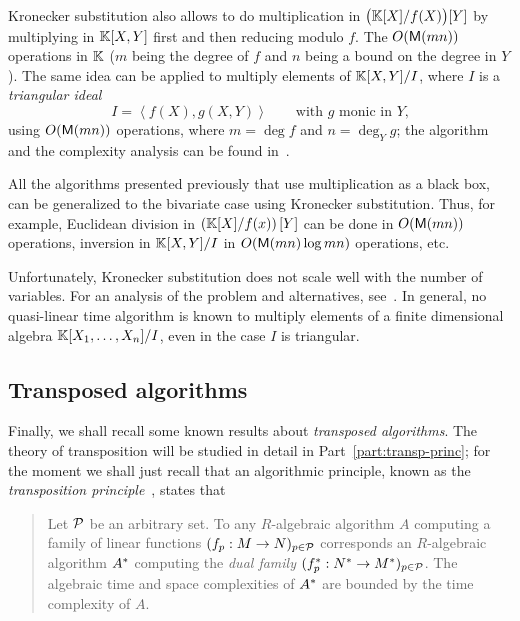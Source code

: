 Kronecker substitution also allows to do multiplication in
$\bigl(\mathbb{K}[X]/f(X)\bigr)[Y]$ by multiplying in $\mathbb{K}[X,Y]$ first and then
reducing modulo $f$. The $O(\mathsf{M}(mn))$ operations in $\mathbb{K}$ ($m$ being
the degree of $f$ and $n$ being a bound on the degree in $Y$). The
same idea can be applied to multiply elements of $\mathbb{K}[X,Y]/I$, where $I$
is a \emph{triangular ideal}
\begin{equation}
  \label{eq:228}
  I = \left\langle f(X), g(X,Y)\right\rangle
  \qquad\text{with $g$ monic in $Y$,}
\end{equation}
using $O(\mathsf{M}(mn))$ operations, where $m=\deg f$ and $n=\deg_Y g$;
the algorithm and the complexity analysis can be found
in~\cite[Proposition~4]{pascal+schost06}.

All the algorithms presented previously that use multiplication as a
black box, can be generalized to the bivariate case using Kronecker
substitution. Thus, for example, Euclidean division in
$\left(\mathbb{K}[X]/f(x)\right)[Y]$ can be done in $O(\mathsf{M}(mn))$ operations,
inversion in $\mathbb{K}[X,Y]/I$ in $O(\mathsf{M}(mn)\log mn)$ operations, etc.

  Unfortunately,
Kronecker substitution does not scale well with the number of
variables. For an analysis of the problem and alternatives,
see~\cite{schost05,li+moreno+schost07}. In general, no quasi-linear
time algorithm is known to multiply elements of a finite dimensional
algebra $\mathbb{K}[X_1,\ldots,X_n]/I$, even in the case $I$ is triangular.


\subsection{Transposed algorithms}
\label{sec:transp-algor}
Finally, we shall recall some known results about
\emph{transposed algorithms}. The theory
of transposition will be studied in detail in
Part~\ref{part:transp-princ}; for the moment we shall just recall that
an algorithmic principle, known as the
\emph{transposition
  principle}~\cite{shoup94,shoup95,shoup99,Ka2K,hanrot+quercia+zimmermann,bostan+lecerf+schost:tellegen},
states that
\begin{quote}
  Let $\mathcal{P}$ be an arbitrary set. To any $R$-algebraic algorithm
  $A$ computing a family of linear functions $(f_p:M\rightarrow
  N)_{p\in\mathcal{P}}$ corresponds an $R$-algebraic algorithm $A^\ast$
  computing the \emph{dual family}
  $(f^\ast_p:N^\ast\rightarrow M^\ast)_{p\in\mathcal{P}}$. The algebraic time
  and space complexities of $A^\ast$ are bounded by the time
  complexity of $A$.
\end{quote}


